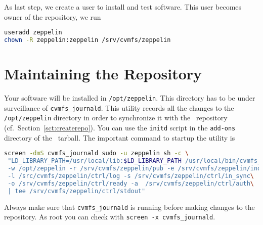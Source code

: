 As last step, we create a user to install and test software.
This user becomes owner of the repository, \ie we run
\begin{lstlisting}[language=bash]
useradd zeppelin
chown -R zeppelin:zeppelin /srv/cvmfs/zeppelin
\end{lstlisting}

\section{Maintaining the Repository}
Your software will be installed in \texttt{/opt/zeppelin}.
This directory has to be under surveillance of \texttt{cvmfs\_journald}.
This utility records all the changes to the \texttt{/opt/zeppelin} directory in order to synchronize it with the \cvmfs\ repository (cf.~Section~\ref{sct:createrepo}).
You can use the \texttt{initd} script in the \texttt{add-ons} directory of the \cvmfs\ tarball.
The important command to startup the utility is
\begin{lstlisting}[language=bash]
screen -dmS cvmfs_journald sudo -u zeppelin sh -c \
 "LD_LIBRARY_PATH=/usr/local/lib:$LD_LIBRARY_PATH /usr/local/bin/cvmfs_journald\
 -w /opt/zeppelin -r /srv/cvmfs/zeppelin/pub -e /srv/cvmfs/zeppelin/inotify_events\
 -l /src/cvmfs/zeppelin/ctrl/log -s /srv/cvmfs/zeppelin/ctrl/in_sync\
 -o /srv/cvmfs/zeppelin/ctrl/ready -a  /srv/cvmfs/zeppelin/ctrl/auth\
 | tee /srv/cvmfs/zeppelin/ctrl/stdout"
\end{lstlisting}
Always make sure that \texttt{cvmfs\_journald} is running before making changes to the repository.
As root you can check with \lstinline{screen -x cvmfs_journald}.

